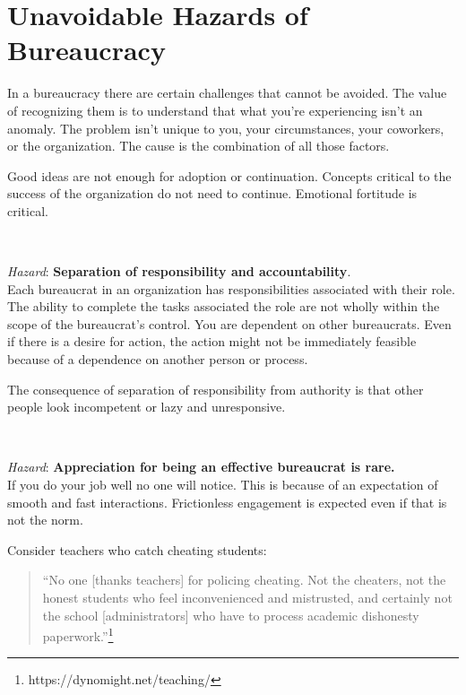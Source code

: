 \section{Unavoidable Hazards of Bureaucracy\label{sec:unavoidable-hazards}}

In a bureaucracy there are certain challenges that cannot be avoided. The value of recognizing them is to understand that what you're experiencing isn't an anomaly. The problem isn't unique to you, your circumstances, your coworkers, or the organization. The cause is the combination of all those factors.

Good ideas are not enough for adoption or continuation.
Concepts critical to the success of the organization do not need to continue. Emotional fortitude is critical.


\ \\

\begin{samepage}
\textit{Hazard}: \textbf{Separation of responsibility and accountability}. \\
Each bureaucrat in an organization has responsibilities associated with their role. The ability to complete the tasks associated the role are not wholly within the scope of the bureaucrat's control. You are dependent on other bureaucrats. Even if there is a desire for action, the action might not be immediately feasible because of a dependence on another person or process. 

The consequence of separation of responsibility from authority is that other people look incompetent or lazy and unresponsive.
\end{samepage}

\ \\

\begin{samepage}
\textit{Hazard}: \textbf{Appreciation for being an effective bureaucrat is rare.}\\
If you do your job well no one will notice. This is because of an expectation of smooth and fast interactions. Frictionless engagement is expected even if that is not the norm. 

Consider teachers who catch cheating students:
\begin{quote}
``No one [thanks teachers] for policing cheating. Not the cheaters, not the honest students who feel inconvenienced and mistrusted, and certainly not the school [administrators] who have to process academic dishonesty paperwork.''\footnote{https://dynomight.net/teaching/}
\end{quote}
\end{samepage}

